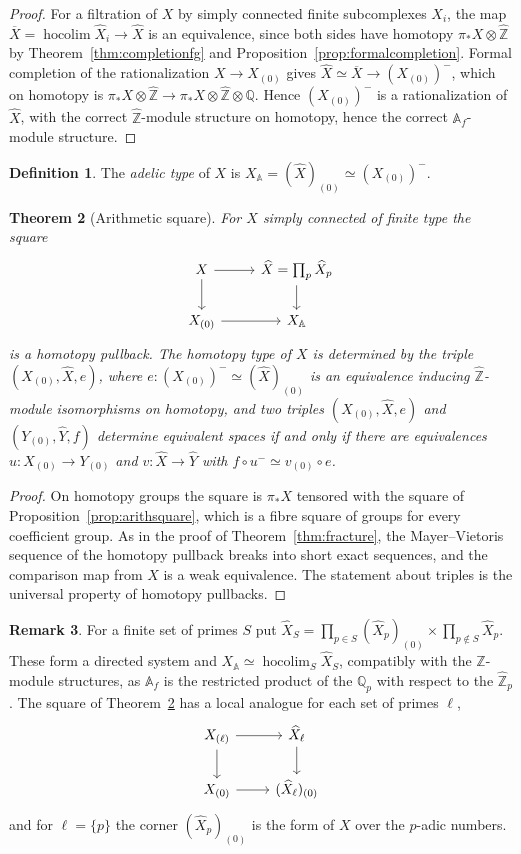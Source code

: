 \documentclass[11pt]{amsart}
\theoremstyle{plain}
\newtheorem{theorem}{Theorem}[section]
\theoremstyle{definition}
\newtheorem{definition}[theorem]{Definition}
\newtheorem{remark}[theorem]{Remark}
\numberwithin{equation}{section}
\newcommand{\Q}{\mathbb{Q}}
\newcommand{\Zhat}{\widehat{\mathbb{Z}}}
\newcommand{\Af}{\mathbb{A}_f}
\newcommand{\hX}{\widehat{X}}
\DeclareMathOperator{\hocolim}{hocolim}
\begin{document}
\begin{proof}
For a filtration of $X$ by simply connected finite subcomplexes $X_i$, the map $\overline X=\hocolim\widehat X_i\to\hX$ is an equivalence, since both sides have homotopy $\pi_*X\otimes\Zhat$ by Theorem~\ref{thm:completionfg} and Proposition~\ref{prop:formalcompletion}.
Formal completion of the rationalization $X\to X_{(0)}$ gives $\hX\simeq\overline X\to(X_{(0)})^-$, which on homotopy is $\pi_*X\otimes\Zhat\to\pi_*X\otimes\Zhat\otimes\Q$.
Hence $(X_{(0)})^-$ is a rationalization of $\hX$, with the correct $\Zhat$-module structure on homotopy, hence the correct $\Af$-module structure.
\end{proof}

\begin{definition}
The \emph{adelic type} of $X$ is $X_{\mathbb A}=(\hX)_{(0)}\simeq(X_{(0)})^-$.
\end{definition}

\begin{theorem}[Arithmetic square]\label{thm:arithmeticsquare}
For $X$ simply connected of finite type the square
\[
\begin{tikzcd}
X\arrow[r]\arrow[d] & \hX=\prod_p\hX_p\arrow[d]\\
X_{(0)}\arrow[r] & X_{\mathbb A}
\end{tikzcd}
\]
is a homotopy pullback.
The homotopy type of $X$ is determined by the triple $(X_{(0)},\hX,e)$, where $e\colon(X_{(0)})^-\simeq(\hX)_{(0)}$ is an equivalence inducing $\Zhat$-module isomorphisms on homotopy, and two triples $(X_{(0)},\hX,e)$ and $(Y_{(0)},\widehat Y,f)$ determine equivalent spaces if and only if there are equivalences $u\colon X_{(0)}\to Y_{(0)}$ and $v\colon\hX\to\widehat Y$ with $f\circ u^-\simeq v_{(0)}\circ e$.
\end{theorem}

\begin{proof}
On homotopy groups the square is $\pi_*X$ tensored with the square of Proposition~\ref{prop:arithsquare}, which is a fibre square of groups for every coefficient group.
As in the proof of Theorem~\ref{thm:fracture}, the Mayer--Vietoris sequence of the homotopy pullback breaks into short exact sequences, and the comparison map from $X$ is a weak equivalence.
The statement about triples is the universal property of homotopy pullbacks.
\end{proof}

\begin{remark}
For a finite set of primes $S$ put $\hX_S=\prod_{p\in S}(\hX_p)_{(0)}\times\prod_{p\notin S}\hX_p$.
These form a directed system and $X_{\mathbb A}\simeq\hocolim_S\hX_S$, compatibly with the $\Zhat$-module structures, as $\Af$ is the restricted product of the $\Q_p$ with respect to the $\Zhat_p$.
The square of Theorem~\ref{thm:arithmeticsquare} has a local analogue for each set of primes $\ell$,
\[
\begin{tikzcd}
X_{(\ell)}\arrow[r]\arrow[d] & \hX_\ell\arrow[d]\\
X_{(0)}\arrow[r] & (\hX_\ell)_{(0)}
\end{tikzcd}
\]
and for $\ell=\{p\}$ the corner $(\hX_p)_{(0)}$ is the form of $X$ over the $p$-adic numbers.
\end{remark}
\end{document}

